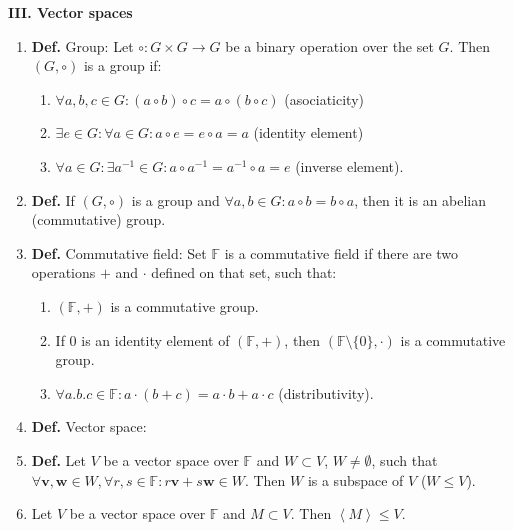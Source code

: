 \documentclass{article}
\newcommand{\<}{\left<}
\renewcommand{\>}{\right>}
\newcommand{\F}{\mathbb{F}}
\newcommand{\define}{\textbf{Def. }}
\begin{document}
\begin{multicols}{3}
\begin{enumerate}[itemsep=2pt, topsep=2pt, partopsep=2pt, parsep=2pt]
    \end{enumerate}

    \textbf{III. Vector spaces}

    \begin{enumerate}[itemsep=2pt, topsep=2pt, partopsep=2pt, parsep=2pt]

        \item \define Group: Let $\circ:G\times G\to G$ be a binary operation over the set $G$. Then $\left(G,\circ\right)$ is a group if:
            \begin{enumerate}[itemsep=0pt, topsep=0pt, partopsep=0pt, parsep=0pt]
                \item $\forall a,b,c\in G:\left(a\circ b\right)\circ c=a\circ\left(b\circ c\right)$ (asociaticity)
                \item $\exists e\in G:\forall a\in G:a\circ e=e\circ a=a$ (identity element)
                \item $\forall a\in G:\exists a^{-1}\in G:a\circ a^{-1}=a^{-1}\circ a=e$ (inverse element).
            \end{enumerate}
        \item \define If $\left(G,\circ\right)$ is a group and $\forall a,b\in G:a\circ b=b\circ a$, then it is an abelian (commutative) group.
        \item \define Commutative field: Set $\F$ is a commutative field if there are two operations $+$ and $\cdot$ defined on that set, such that:
            \begin{enumerate}[itemsep=0pt, topsep=0pt, partopsep=0pt, parsep=0pt]
                \item $\left(\F,+\right)$ is a commutative group.
                \item If $0$ is an identity element of $\left(\F,+\right)$, then $\left(\F\setminus\{0\},\cdot\right)$ is a commutative group.
                \item $\forall a.b.c\in\F:a\cdot(b+c)=a\cdot b+a\cdot c$ (distributivity).
            \end{enumerate}
        \item \define Vector space: %
        \item \define Let $V$ be a vector space over $\F$ and $W\subset V$, $W\neq\emptyset$, such that $\forall \bm v,\bm w\in W,\forall r,s\in\F:r\bm v+s\bm w\in W$. Then $W$ is a subspace of $V$ ($W\leq V$).
        \item Let $V$ be a vector space over $\F$ and $M\subset V$. Then $\<M\>\leq V$.

\end{enumerate}
\end{multicols}
\end{document}
